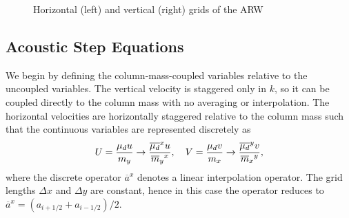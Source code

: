 %
%
\begin{figure}[ht]
  \caption{\label{figure:2}Horizontal (left) and vertical (right) grids of the ARW}
\end{figure}

\subsection{Acoustic Step Equations}
\label{acoustic_discretization}

We begin by defining the column-mass-coupled variables relative to the
uncoupled variables.  The vertical velocity is staggered only in $k$, so
it can be coupled directly to the column mass with no averaging or
interpolation.  The horizontal velocities are horizontally staggered
relative to the column mass such that the continuous variables are 
represented discretely as
%
\begin{equation}
U = {\mu_d u \over m_y} \to 
{\overline{\mu_d}^x u \over {\overline m_y}^x} , 
~~~ V = {\mu_d v \over m_x} \to {\overline{\mu_d}^y v \over {\overline m_x}^y} , 
\notag
\end{equation}
%
\noindent
where the discrete operator 
$\overline{a}^x $
denotes a linear
interpolation operator.  The grid lengths $\Delta x$ and $\Delta y$ are
constant, hence in this case the operator reduces to $\overline{a}^x =
(a_{i+1/2} + a_{i-1/2})/2$.  

